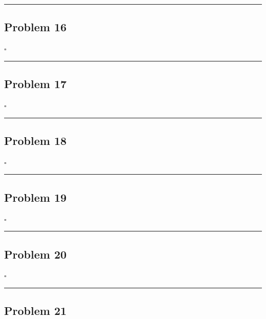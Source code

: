 \documentclass[12pt]{article}
\newcommand*{\QEDB}{\hfill\ensuremath{\square}}
\newcommand{\horrule}[1]{\rule{\linewidth}{#1}}
\begin{document}
\horrule{0.5pt}

\subsection*{Problem 16}

\QEDB

\horrule{0.5pt}

\subsection*{Problem 17}

\QEDB

\horrule{0.5pt}

\subsection*{Problem 18}

\QEDB

\horrule{0.5pt}

\subsection*{Problem 19}

\QEDB

\horrule{0.5pt}

\subsection*{Problem 20}

\QEDB

\horrule{0.5pt}

\subsection*{Problem 21}
\end{document}
